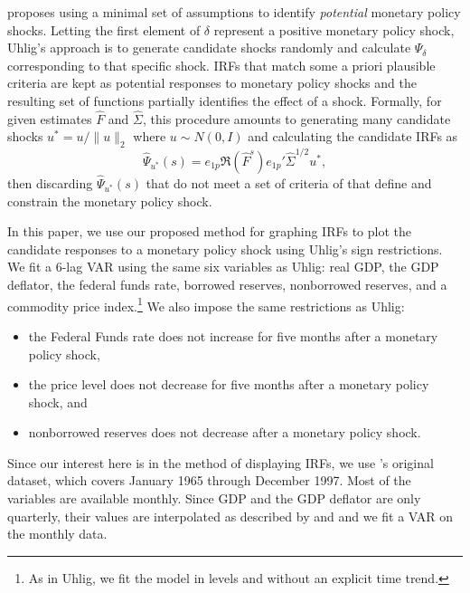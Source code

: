 \documentclass[12pt,fleqn]{article}
\begin{document}
\citet{Uhl:05} proposes using a minimal set of assumptions to identify
\emph{potential} monetary policy shocks. Letting the first element of
$\delta$ represent a positive monetary policy shock, Uhlig's approach
is to generate candidate shocks randomly and calculate $\Psi_\delta$
corresponding to that specific shock. IRFs that match some a priori
plausible criteria are kept as potential responses to monetary policy
shocks and the resulting set of functions partially identifies the
effect of a shock. Formally, for given estimates $\hat F$ and
$\hat \Sigma$, this procedure amounts to generating many candidate
shocks $u^* = u / \| u \|_2$ where $u \sim N(0,I)$ and calculating the
candidate IRFs as
\begin{equation}
  \label{eq:15}
  \hat \Psi_{u^*}(s) =  e_{1p} \Re(\hat F^s) e_{1p}' \hat\Sigma^{1/2} u^*,
\end{equation}
then discarding $\hat\Psi_{u^*}(s)$ that do not meet a set of criteria of
that define and constrain the monetary policy shock.

In this paper, we use our proposed method for graphing IRFs to plot
the candidate responses to a monetary policy shock using Uhlig's sign
restrictions. We fit a 6-lag VAR using the same six variables as
Uhlig: real GDP, the GDP deflator, the federal funds rate, borrowed
reserves, nonborrowed reserves, and a commodity price
index.\footnote{%
  As in Uhlig, we fit the model in levels and without an explicit time
  trend.} %
We also impose the same restrictions as Uhlig:
\begin{itemize}[noitemsep]
\item the Federal Funds rate does not increase for five months after a
  monetary policy shock,
\item the price level does not decrease for five months after a
  monetary policy shock, and
\item nonborrowed reserves does not decrease after a monetary policy
  shock.
\end{itemize}
Since our interest here is in the method of displaying IRFs, we use
\citeauthor{BeM:98}'s original dataset, which covers January 1965
through December 1997.  Most of the variables are available
monthly. Since GDP and the GDP deflator are only quarterly, their
values are interpolated as described by \citet{BGW:97} and
\citet{BeM:98} and we fit a VAR on the monthly data.
\end{document}
